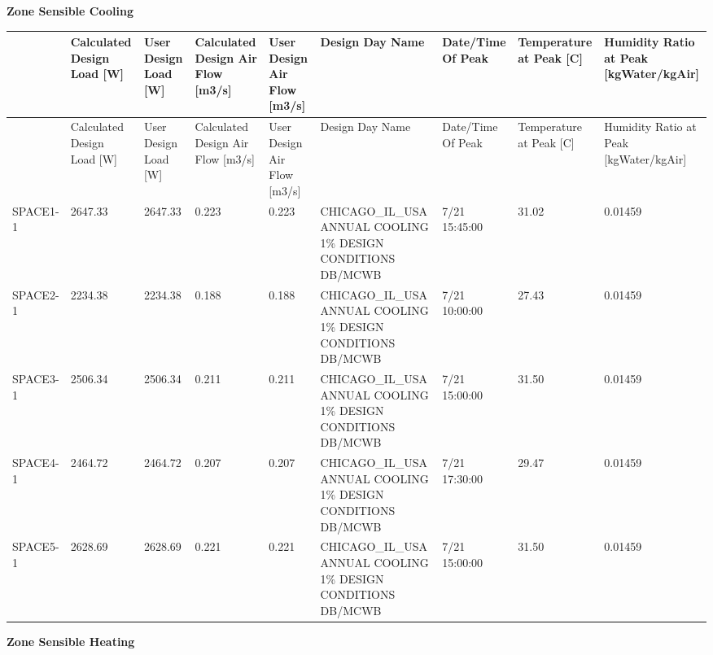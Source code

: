 \textbf{Zone Sensible Cooling}

{\scriptsize
\begin{longtable}[c]{>{\raggedright}p{0.66in}>{\raggedright}p{0.66in}>{\raggedright}p{0.66in}>{\raggedright}p{0.66in}>{\raggedright}p{0.66in}>{\raggedright}p{0.66in}>{\raggedright}p{0.66in}>{\raggedright}p{0.66in}>{\raggedright}p{0.66in}}
\toprule
 & Calculated Design Load [W] & User Design Load [W] & Calculated Design Air Flow [m3/s] & User Design Air Flow [m3/s] & Design Day Name & Date/Time Of Peak & Temperature at Peak [C] & Humidity Ratio at Peak [kgWater/kgAir] \tabularnewline
\midrule
\endfirsthead

\toprule
 & Calculated Design Load [W] & User Design Load [W] & Calculated Design Air Flow [m3/s] & User Design Air Flow [m3/s] & Design Day Name & Date/Time Of Peak & Temperature at Peak [C] & Humidity Ratio at Peak [kgWater/kgAir] \tabularnewline
\midrule
\endhead

SPACE1-1 & 2647.33 & 2647.33 & 0.223 & 0.223 & CHICAGO\-\_IL\-\_USA ANNUAL COOLING 1\% DESIGN CONDITIONS DB/MCWB & 7/21 15:45:00 & 31.02 & 0.01459 \tabularnewline
SPACE2-1 & 2234.38 & 2234.38 & 0.188 & 0.188 & CHICAGO\-\_IL\-\_USA ANNUAL COOLING 1\% DESIGN CONDITIONS DB/MCWB & 7/21 10:00:00 & 27.43 & 0.01459 \tabularnewline
SPACE3-1 & 2506.34 & 2506.34 & 0.211 & 0.211 & CHICAGO\-\_IL\-\_USA ANNUAL COOLING 1\% DESIGN CONDITIONS DB/MCWB & 7/21 15:00:00 & 31.50 & 0.01459 \tabularnewline
SPACE4-1 & 2464.72 & 2464.72 & 0.207 & 0.207 & CHICAGO\-\_IL\-\_USA ANNUAL COOLING 1\% DESIGN CONDITIONS DB/MCWB & 7/21 17:30:00 & 29.47 & 0.01459 \tabularnewline
SPACE5-1 & 2628.69 & 2628.69 & 0.221 & 0.221 & CHICAGO\-\_IL\-\_USA ANNUAL COOLING 1\% DESIGN CONDITIONS DB/MCWB & 7/21 15:00:00 & 31.50 & 0.01459 \tabularnewline
\bottomrule
\end{longtable}}

\textbf{Zone Sensible Heating}

